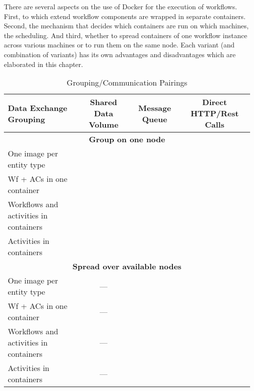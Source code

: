 
There are several aspects on the use of Docker for the execution of workflows. First, to which extend workflow components are wrapped in separate containers. Second, the mechanism that decides which containers are run on which machines, \ie the scheduling. And third, whether to spread containers of one workflow instance across various machines or to run them on the same node. Each variant (and combination of variants) has its own advantages and disadvantages which are elaborated in this chapter.


\begin{table}
  \centering
  \begin{tabular}[c]{p{3cm}|c|c|c}
    \toprule
    \textbf{Data Exchange \newline Grouping}
    & Shared Data Volume
    & Message Queue
    & Direct HTTP/Rest Calls \\

    \midrule

    \multicolumn{4}{c}{\textbf{Group on one node} }\\ \hline

    One image per \newline entity type
    &&&
    \\ \hline

    Wf + ACs in \newline one container
    &&&
    \\ \hline

    Workflows and \newline activities in \newline containers
    &&&
    \\ \hline

    Activities in \newline containers
    &&&
    \\ \hline

    \multicolumn{4}{c}{\textbf{Spread over available nodes} }\\ \hline

    One image per \newline entity type
    & --- &&
    \\ \hline
    Wf + ACs in \newline one container
    & --- &&
    \\ \hline
    Workflows and \newline activities in \newline containers
    & --- &&
    \\ \hline
    Activities in \newline containers
    & --- &&
    \\ \hline

    \bottomrule
  \end{tabular}
  \caption{Grouping/Communication Pairings}
  \label{tab:objectives_and_requirements}
\end{table}

